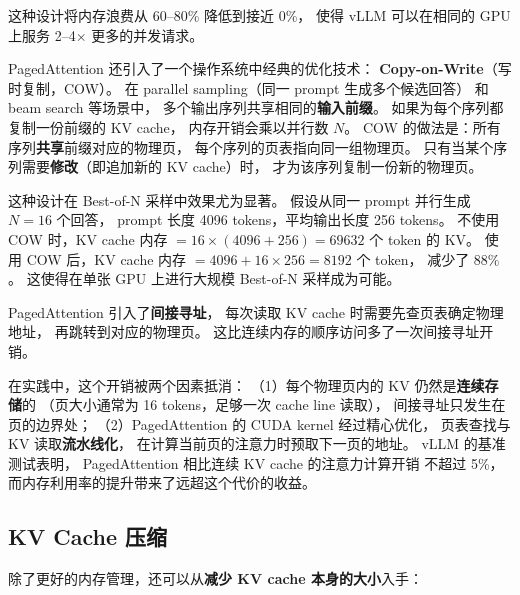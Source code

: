 这种设计将内存浪费从 60--80\% 降低到接近 0\%，
使得 vLLM 可以在相同的 GPU 上服务 2--4$\times$ 更多的并发请求。

PagedAttention 还引入了一个操作系统中经典的优化技术：
\textbf{Copy-on-Write}（写时复制，COW）。
在 parallel sampling（同一 prompt 生成多个候选回答）
和 beam search 等场景中，
多个输出序列共享相同的\textbf{输入前缀}。
如果为每个序列都复制一份前缀的 KV cache，
内存开销会乘以并行数 $N$。
COW 的做法是：所有序列\textbf{共享}前缀对应的物理页，
每个序列的页表指向同一组物理页。
只有当某个序列需要\textbf{修改}（即追加新的 KV cache）时，
才为该序列复制一份新的物理页。

这种设计在 Best-of-N 采样中效果尤为显著。
假设从同一 prompt 并行生成 $N=16$ 个回答，
prompt 长度 4096 tokens，平均输出长度 256 tokens。
不使用 COW 时，KV cache 内存 $= 16 \times (4096 + 256) = 69632$ 个 token 的 KV。
使用 COW 后，KV cache 内存 $= 4096 + 16 \times 256 = 8192$ 个 token，
减少了 $88\%$。
这使得在单张 GPU 上进行大规模 Best-of-N 采样成为可能。

\begin{whybox}
PagedAttention 引入了\textbf{间接寻址}，
每次读取 KV cache 时需要先查页表确定物理地址，
再跳转到对应的物理页。
这比连续内存的顺序访问多了一次间接寻址开销。

在实践中，这个开销被两个因素抵消：
（1）每个物理页内的 KV 仍然是\textbf{连续存储}的
（页大小通常为 16 tokens，足够一次 cache line 读取），
间接寻址只发生在页的边界处；
（2）PagedAttention 的 CUDA kernel 经过精心优化，
页表查找与 KV 读取\textbf{流水线化}，
在计算当前页的注意力时预取下一页的地址。
vLLM 的基准测试表明，
PagedAttention 相比连续 KV cache 的注意力计算开销
不超过 5\%，而内存利用率的提升带来了远超这个代价的收益。
\end{whybox}

\subsection{KV Cache 压缩}

除了更好的内存管理，还可以从\textbf{减少 KV cache 本身的大小}入手：

